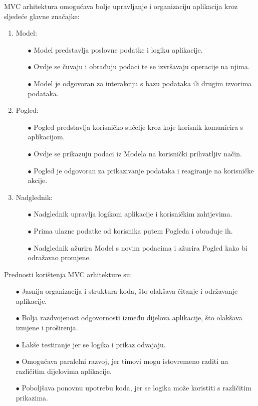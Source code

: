 \documentclass[times, utf8, zavrsni]{fer}
\begin{document}
\vspace{\baselineskip}

MVC arhitektura omogućava bolje upravljanje i organizaciju aplikacija kroz sljedeće glavne značajke:


\begin{enumerate}
    
    \item Model:
    \begin{itemize}
        \item[$\bullet$] Model predstavlja poslovne podatke i logiku aplikacije.
        \item[$\bullet$] Ovdje se čuvaju i obrađuju podaci te se izvršavaju operacije na njima.
        \item[$\bullet$] Model je odgovoran za interakciju s bazu podataka ili drugim izvorima podataka.
    \end{itemize}

    \item Pogled:
    \begin{itemize}
        \item[$\bullet$] Pogled predstavlja korisničko sučelje kroz koje korisnik komunicira s aplikacijom.
        \item[$\bullet$] Ovdje se prikazuju podaci iz Modela na korisnički prihvatljiv način.
        \item[$\bullet$] Pogled je odgovoran za prikazivanje podataka i reagiranje na korisničke akcije.
    \end{itemize}

    \item Nadglednik:
    \begin{itemize}
        \item[$\bullet$] Nadglednik upravlja logikom aplikacije i korisničkim zahtjevima.
        \item[$\bullet$] Prima ulazne podatke od korisnika putem Pogleda i obrađuje ih.
        \item[$\bullet$] Nadglednik ažurira Model s novim podacima i ažurira Pogled kako bi odražavao promjene.
    \end{itemize}

\end{enumerate}


\noindent Prednosti korištenja MVC arhitekture su:


\begin{itemize}
    \item[$\bullet$] Jasnija organizacija i struktura koda, što olakšava čitanje i održavanje aplikacije.
    \item[$\bullet$] Bolja razdvojenost odgovornosti između dijelova aplikacije, što olakšava izmjene i proširenja.
    \item[$\bullet$] Lakše testiranje jer se logika i prikaz odvajaju.
    \item[$\bullet$] Omogućava paralelni razvoj, jer timovi mogu istovremeno raditi na različitim dijelovima aplikacije.
    \item[$\bullet$] Poboljšava ponovnu upotrebu koda, jer se logika može koristiti s različitim prikazima.
\end{itemize}
\end{document}

